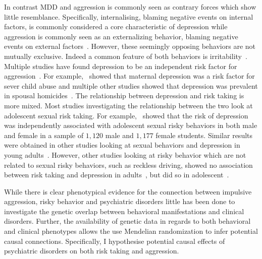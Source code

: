 In contrast MDD and aggression is commonly seen as contrary forces which show little resemblance.
Specifically, internalising, blaming negative events on internal factors, is commonly considered a core characteristic of depression while aggression is commonly seen as an externalizing behavior, blaming negative events on external factors~\cite{APA1994,AmericanPsychiatricAssociation2013}.
However, these seemingly opposing behaviors are not mutually exclusive. 
Indeed a common feature of both behaviors is irritability~\cite{Dutton2013}.
Multiple studies have found depression to be an independent risk factor for aggression~\cite{Sher2005,Roland2002,Taft2009, Dutton2013}.
For example,~\citet{Windham2004} showed that maternal depression was a risk factor for sever child abuse and multiple other studies showed that depression was prevalent in spousal homicides~\cite{Stith2004}.
The relationship between depression and risk taking is more mixed.
Most studies investigating the relationship between the two look at adolescent sexual risk taking.
For example,~\citet{Wilson2010} showed that the risk of depression was independently associated with adolescent sexual risky behaviors in both male and female in a sample of $1,120$ male and $1,177$ female students.
Similar results were obtained in other studies looking at sexual behaviors and depression in young adults~\cite{Auerbach2010,Auerbach2007,Othieno2015}.
However, other studies looking at risky behavior which are not related to sexual risky behaviors, such as reckless driving, showed no association between risk taking and depression in adults~\cite{Vassallo2008}, but did so in adolescent~\cite{McDonald2014}. 

While there is clear phenotypical evidence for the connection between impulsive aggression, risky behavior and psychiatric disorders little has been done to investigate the genetic overlap between behavioral manifestations and clinical disorders.
Further, the availability of genetic data in regards to both behavioral and clinical phenotypes allows the use Mendelian randomization to infer potential causal connections.
Specifically, I hypothesise potential causal effects of psychiatric disorders on both risk taking and aggression.
